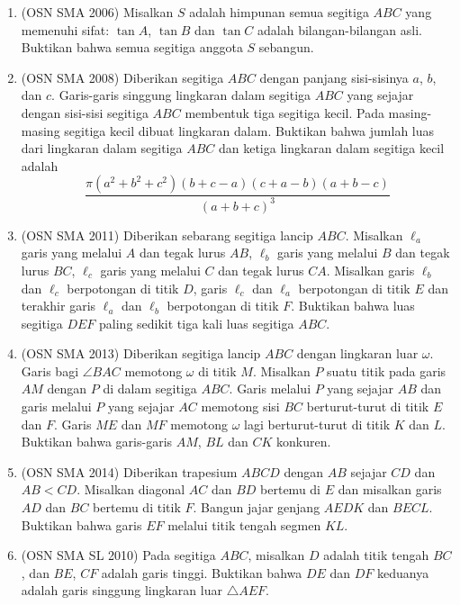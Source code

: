 \documentclass[12pt]{scrartcl}
\begin{document}
\begin{enumerate}
    \item (OSN SMA 2006) Misalkan $S$ adalah himpunan semua segitiga $ABC$ yang memenuhi sifat: $\tan A$, $\tan B$ dan $\tan C$ adalah bilangan-bilangan asli. Buktikan bahwa semua segitiga anggota $S$ sebangun.

    \item (OSN SMA 2008) Diberikan segitiga $ABC$ dengan panjang sisi-sisinya $a$, $b$, dan $c$. Garis-garis singgung lingkaran dalam segitiga $ABC$ yang sejajar dengan sisi-sisi segitiga $ABC$ membentuk tiga segitiga kecil. Pada masing-masing segitiga kecil dibuat lingkaran dalam. Buktikan bahwa jumlah luas dari lingkaran dalam segitiga $ABC$ dan ketiga lingkaran dalam segitiga kecil adalah
    \[\frac{\pi(a^2 + b^2 + c^2)(b + c - a)(c + a - b)(a + b - c)}{(a + b + c)^3}\]

    \item (OSN SMA 2011) Diberikan sebarang segitiga lancip $ABC$. Misalkan $\ell_a$ garis yang melalui $A$ dan tegak lurus $AB$, $\ell_b$ garis yang melalui $B$ dan tegak lurus $BC$, $\ell_c$ garis yang melalui $C$ dan tegak lurus $CA$. Misalkan garis $\ell_b$ dan $\ell_c$ berpotongan di titik $D$, garis $\ell_c$ dan $\ell_a$ berpotongan di titik $E$ dan terakhir garis $\ell_a$ dan $\ell_b$ berpotongan di titik $F$. Buktikan bahwa luas segitiga $DEF$ paling sedikit tiga kali luas segitiga $ABC$.

    \item (OSN SMA 2013) Diberikan segitiga lancip $ABC$ dengan lingkaran luar $\omega$. Garis bagi $\angle BAC$ memotong $\omega$ di titik $M$. Misalkan $P$ suatu titik pada garis $AM$ dengan $P$ di dalam segitiga $ABC$. Garis melalui $P$ yang sejajar $AB$ dan garis melalui $P$ yang sejajar $AC$ memotong sisi $BC$ berturut-turut di titik $E$ dan $F$. Garis $ME$ dan $MF$ memotong $\omega$ lagi berturut-turut di titik $K$ dan $L$. Buktikan bahwa garis-garis $AM$, $BL$ dan $CK$ konkuren.

    \item (OSN SMA 2014) Diberikan trapesium $ABCD$ dengan $AB$ sejajar $CD$ dan $AB < CD$. Misalkan diagonal $AC$ dan $BD$ bertemu di $E$ dan misalkan garis $AD$ dan $BC$ bertemu di titik $F$. Bangun jajar genjang $AEDK$ dan $BECL$. Buktikan bahwa garis $EF$ melalui titik tengah segmen $KL$.

    \item (OSN SMA SL 2010) Pada segitiga $ABC$, misalkan $D$ adalah titik tengah $BC$, dan $BE$, $CF$ adalah garis tinggi. Buktikan bahwa $DE$ dan $DF$ keduanya adalah garis singgung lingkaran luar $\triangle AEF$. %

\end{enumerate}
\end{document}
